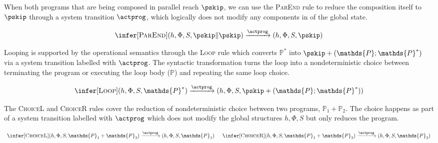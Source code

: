 When both programs that are being composed in parallel reach $\pskip$, we can use the \textsc{ParEnd} rule to reduce the composition itself to $\pskip$ through a system transition $\actprog$, which logically does not modify any components in of the global state.

\[
\infer[\textsc{ParEnd}]
{
	 (h, \Phi, S, \pskip \| \pskip)
	\xrightarrow{\actprog}
	(h, \Phi, S, \pskip)
}
{}
\]

Looping is supported by the operational semantics through the \textsc{Loop} rule which converts $\mathds{P}^*$ into $\pskip + (\mathds{P} ; \mathds{P}^*)$ via a system transition labelled with $\actprog$. The syntactic transformation turns the loop into a nondeterministic choice between terminating the program or executing the loop body ($\mathds{P}$) and repeating the same loop choice.

\[
\infer[\textsc{Loop}]
{
	 (h, \Phi, S, \mathds{P}^*)
	\xrightarrow{\actprog}
	(h, \Phi, S, \pskip + (\mathds{P} ; \mathds{P}^*))
}
{}
\]

The \textsc{ChoiceL} and \textsc{ChoiceR} rules cover the reduction of nondeterministic choice between two programs, $\mathds{P}_1 + \mathds{P}_2$. The choice happens as part of a system transition labelled with $\actprog$ which does not modify the global structures $h, \Phi, S$ but only reduces the program.

\[
	\begin{array}{c @{\hspace{15pt}} c}
		\infer[\textsc{ChoiceL}]
		{
			 (h, \Phi, S, \mathds{P}_1 + \mathds{P}_2)
			\xrightarrow{\actprog}
			(h, \Phi, S, \mathds{P}_1)
		}
		{}
		&
		\infer[\textsc{ChoiceR}]
		{
			 (h, \Phi, S, \mathds{P}_1 + \mathds{P}_2)
			\xrightarrow{\actprog}
			(h, \Phi, S, \mathds{P}_2)
		}
		{}
	\end{array}
\]